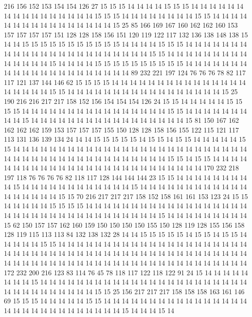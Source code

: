 216 156 152 153 154 154 126 27 15 15 15 14 14 14 14 15 15 15 14 14
14 14 14 14 14 14 14 14 14 14 14 14 14 14 15 15 15 14 14 14
14 14 14 14 14 15 15 14 14 14 14 14 14 14 14 14 14 14 14 14
14 14 14 15 25 85 166 169 167 160 162 162 160 153 157 157 157 157 151 128
128 158 156 151 120 119 122 117 132 136 138 148 138 15 14 14 15 15 15 15
15 15 15 15 15 15 15 14 14 14 14 15 15 15 14 14 14 14 14 14
14 14 14 14 14 14 14 14 14 14 14 14 14 14 14 14 14 15 15 14
14 14 14 14 14 14 14 14 14 14 14 14 14 15 14 14 14 14 15 15
15 15 15 15 15 15 15 15 14 14 14 14 14 14 14 14 14 14 14 14
14 14 14 14 14 14 14 14 14 89 232 221 197 124 76 76 76 78 82 117
117 121 137 144 146 62 15 15 15 15 14 14 14 14 14 14 14 14 14 14
14 14 14 14 14 14 14 14 14 14 15 15 14 14 14 14 14 14 14 14
14 14 14 14 14 14 14 14 14 15 25 190 216 216 217 217 158 152 156 154
154 154 126 24 15 15 14 14 14 14 14 15 15 15 15 14 14 14 14 14
14 14 14 14 14 14 14 14 14 14 14 15 15 14 14 14 14 14 14 14
14 14 15 14 14 14 14 14 14 14 14 14 14 14 14 14 14 14 14 14
15 81 150 167 162 162 162 162 159 153 157 157 157 155 150 128 128 158 156 155
122 115 121 117 113 131 136 139 134 24 14 14 15 15 15 15 15 14 15 15
14 15 15 14 14 14 14 14 15 15 14 14 14 14 14 14 14 14 14 14
14 14 14 14 14 14 14 14 14 14 14 14 14 14 14 14 14 14 14 14
14 14 14 14 14 14 14 14 14 14 14 14 14 14 15 15 14 15 15 14
14 14 14 14 14 14 14 14 14 14 14 14 14 14 14 14 14 14 14 14
14 14 14 14 14 170 232 218 197 118 76 76 76 76 82 118 117 128 144 144
144 23 15 15 14 14 14 14 14 14 14 14 14 15 14 14 14 14 14 14
14 14 14 14 14 14 15 14 14 14 14 14 14 14 14 14 14 14 14 14
14 14 14 14 14 15 15 70 216 217 217 217 158 152 158 161 161 153 123 24
15 15 14 14 14 14 14 15 15 15 15 14 14 14 14 14 14 14 14 14
14 14 14 14 14 14 14 14 14 14 14 14 14 14 14 14 14 14 14 14
14 14 14 14 14 14 15 14 14 14 14 14 14 14 14 14 15 62 150 157
157 162 160 159 150 150 150 150 155 150 128 119 128 155 156 158 128 119 115 113
113 84 132 138 132 28 14 14 15 15 15 15 15 14 15 15 14 15 15 14
14 14 14 14 15 15 14 14 14 14 14 14 14 14 14 14 14 14 14 14
14 14 14 14 14 14 14 14 14 14 14 14 14 14 14 14 14 14 14 14
14 14 14 14 14 14 14 14 14 14 14 14 14 14 14 14 14 14 14 14
14 14 14 14 14 14 14 14 14 14 14 14 14 14 14 14 14 14 14 14
14 172 232 200 216 123 83 114 76 45 78 118 117 122 118 122 91 24 15 14
14 14 14 14 14 14 14 15 14 14 14 14 14 14 14 14 14 14 14 14
14 14 14 14 14 14 14 14 14 14 14 14 14 14 14 14 14 14 14 14
14 15 15 25 156 217 217 217 158 158 158 163 161 146 69 15 15 15 14 14
14 14 14 15 15 14 14 14 14 14 14 14 14 14 14 14 14 14 14 14
14 14 14 14 14 14 14 14 14 14 14 14 14 14 15 14 14 14 15 14

